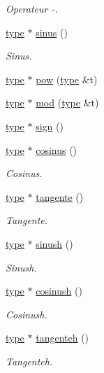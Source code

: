 \begin{DoxyCompactItemize}
\begin{DoxyCompactList}\small\item\em Operateur -\/. \end{DoxyCompactList}\item 
\hyperlink{classtype}{type} $\ast$ \hyperlink{classentier_ae69e6bbd83eec7a85f35a47aa84ec16c}{sinus} ()
\begin{DoxyCompactList}\small\item\em Sinus. \end{DoxyCompactList}\item 
\hyperlink{classtype}{type} $\ast$ \hyperlink{classentier_adc71e10e6ea385f7c1aa1de06e2d1b4c}{pow} (\hyperlink{classtype}{type} \&t)
\item 
\hyperlink{classtype}{type} $\ast$ \hyperlink{classentier_a4e5c25c0ed52135136bb75563a9337e7}{mod} (\hyperlink{classtype}{type} \&t)
\item 
\hyperlink{classtype}{type} $\ast$ \hyperlink{classentier_a4a25b08f29eba0a531bebadeaf77ee04}{sign} ()
\item 
\hyperlink{classtype}{type} $\ast$ \hyperlink{classentier_aff98af6a48e8051e4b7f8b5ce9f192ae}{cosinus} ()
\begin{DoxyCompactList}\small\item\em Cosinus. \end{DoxyCompactList}\item 
\hyperlink{classtype}{type} $\ast$ \hyperlink{classentier_aa405bfd127fc9baf2ee3d0bdbf72309a}{tangente} ()
\begin{DoxyCompactList}\small\item\em Tangente. \end{DoxyCompactList}\item 
\hyperlink{classtype}{type} $\ast$ \hyperlink{classentier_ac26dfe71ead5fdd395b0404a76d30bb7}{sinush} ()
\begin{DoxyCompactList}\small\item\em Sinush. \end{DoxyCompactList}\item 
\hyperlink{classtype}{type} $\ast$ \hyperlink{classentier_a567bb5589f8f988d6ee782dacada8ca5}{cosinush} ()
\begin{DoxyCompactList}\small\item\em Cosinush. \end{DoxyCompactList}\item 
\hyperlink{classtype}{type} $\ast$ \hyperlink{classentier_a215fe89e3f8731831b168a21779bf951}{tangenteh} ()
\begin{DoxyCompactList}\small\item\em Tangenteh. \end{DoxyCompactList}\item 

\end{DoxyCompactItemize}
